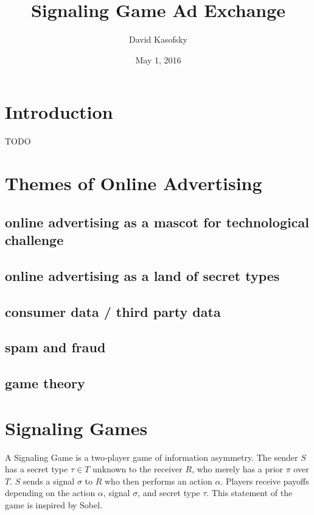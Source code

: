 \documentclass{article}
\title{Signaling Game Ad Exchange}
\author{David Kasofsky}
\date{May 1, 2016}
\begin{document}
\maketitle

\newpage

\tableofcontents

\newpage

\section{Introduction}

TODO

\newpage

\section{Themes of Online Advertising}

\subsection{online advertising as a mascot for technological challenge}
\subsection{online advertising as a land of secret types}
\subsection{consumer data / third party data}
\subsection{spam and fraud}
\subsection{game theory}

\section{Signaling Games}

A Signaling Game is a two-player game of information asymmetry. The sender $S$ has a secret type $\tau \in T$ unknown to the receiver $R$, who merely has a prior $\pi$ over $T$. $S$ sends a signal $\sigma$ to $R$ who then performs an action $\alpha$. Players receive payoffs depending on the action $\alpha$, signal $\sigma$, and secret type $\tau$. This statement of the game is inspired by Sobel\cite{sobel1}.
\end{document}

